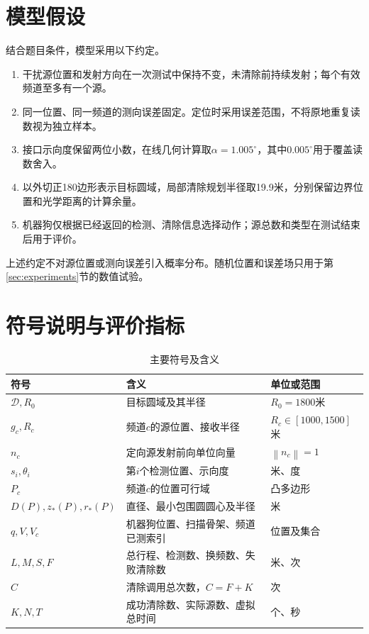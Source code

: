 \documentclass[UTF8,fontset=fandol,a4paper,zihao=-4]{ctexart}
\newcommand{\norm}[1]{\left\lVert#1\right\rVert}
\newcommand{\disk}{\mathcal D}
\begin{document}
\section{模型假设}
结合题目条件，模型采用以下约定。
\begin{enumerate}
\item 干扰源位置和发射方向在一次测试中保持不变，未清除前持续发射；每个有效频道至多有一个源。
\item 同一位置、同一频道的测向误差固定。定位时采用误差范围，不将原地重复读数视为独立样本。
\item 接口示向度保留两位小数，在线几何计算取$\alpha=1.005^\circ$，其中$0.005^\circ$用于覆盖读数舍入。
\item 以外切正180边形表示目标圆域，局部清除规划半径取19.9米，分别保留边界位置和光学距离的计算余量。
\item 机器狗仅根据已经返回的检测、清除信息选择动作；源总数和类型在测试结束后用于评价。
\end{enumerate}

上述约定不对源位置或测向误差引入概率分布。随机位置和误差场只用于第\ref{sec:experiments}节的数值试验。

\section{符号说明与评价指标}
\begin{table}[H]\centering\small
\caption{主要符号及含义}
\begin{tabular}{lll}\toprule
符号 & 含义 & 单位或范围\\\midrule
$\disk,R_0$ & 目标圆域及其半径 & $R_0=1800$米\\
$g_c,R_c$ & 频道$c$的源位置、接收半径 & $R_c\in[1000,1500]$米\\
$n_c$ & 定向源发射前向单位向量 & $\norm{n_c}=1$\\
$s_i,\theta_i$ & 第$i$个检测位置、示向度 & 米、度\\
$P_c$ & 频道$c$的位置可行域 & 凸多边形\\
$D(P),z_*(P),r_*(P)$ & 直径、最小包围圆圆心及半径 & 米\\
$q,V,V_c$ & 机器狗位置、扫描骨架、频道已测索引 & 位置及集合\\
$L,M,S,F$ & 总行程、检测数、换频数、失败清除数 & 米、次\\
$C$ & 清除调用总次数，$C=F+K$ & 次\\
$K,N,T$ & 成功清除数、实际源数、虚拟总时间 & 个、秒\\\bottomrule
\end{tabular}
\end{table}
\end{document}

